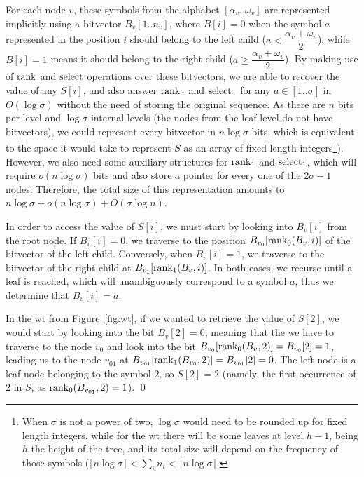 \documentclass[a4paper,10pt,twoside]{book}
\begin{document}
    For each node $v$, these symbols from the alphabet $[\alpha_v..\omega_v]$ are represented implicitly using a bitvector $B_v[1..n_v]$, where $B[i] = 0$ when the symbol $a$ represented in the position $i$ should belong to the left child ($a < \dfrac{\alpha_v + \omega_v}{2}$), while $B[i] = 1$ means it should belong to the right child ($a \geq \dfrac{\alpha_v + \omega_v}{2}$). By making use of $\operatorname{rank}$ and $\operatorname{select}$ operations over these bitvectors, we are able to recover the value of any $S[i]$, and also answer $\operatorname{rank}_a$ and $\operatorname{select}_a$ for any $a \in [1..\sigma]$ in $O(\log\sigma)$ without the need of storing the original sequence. As there are $n$ bits per level and $\log\sigma$ internal levels (the nodes from the leaf level do not have bitvectors), we could represent every bitvector in $n\log\sigma$ bits, which is equivalent to the space it would take to represent $S$ as an array of fixed length integers\footnote{When $\sigma$ is not a power of two, $\log\sigma$ would need to be rounded up for fixed length integers, while for the \gls{wt} there will be some leaves at level $h-1$, being $h$ the height of the tree, and its total size will depend on the frequency of those symbols ($\lfloor n\log\sigma\rfloor < \sum_i n_i < \rceil n\log\sigma\rceil$.}). However, we also need some auxiliary structures for $\operatorname{rank}_1$ and $\operatorname{select}_1$, which will require $o(n\log\sigma)$ bits and also store a pointer for every one of the $2\sigma-1$ nodes. Therefore, the total size of this representation amounts to $n\log\sigma + o(n\log\sigma) + O(\sigma\log n)$.
    
    In order to access the value of $S[i]$, we must start by looking into $B_v[i]$ from the root node. If $B_v[i]=0$, we traverse to the position $B_{v_0}[\operatorname{rank}_0(B_v,i)]$ of the bitvector of the left child. Conversely, when $B_v[i]=1$, we traverse to the bitvector of the right child at $B_{v_1}[\operatorname{rank}_1(B_v,i)]$. In both cases, we recurse until a leaf is reached, which will unambiguously correspond to a symbol $a$, thus we determine that $B_v[i]=a$.
    
    \begin{example} \label{exp:wtaccess}
    In the \gls{wt} from Figure~\ref{fig:wt}, if we wanted to retrieve the value of $S[2]$, we would start by looking into the bit $B_v[2]=0$, meaning that the we have to traverse to the node $v_0$ and look into the bit $B_{v_0}[\operatorname{rank}_0(B_v,2)] = B_{v_0}[2] = 1$, leading us to the node $v_{01}$ at $B_{v_{01}}[\operatorname{rank}_1(B_{v_0},2)] = B_{v_{01}}[2] = 0$. The left node is a leaf node belonging to the symbol $2$, so $S[2]=2$ (namely, the first occurrence of $2$ in $S$, as $\operatorname{rank}_0(B_{v_{01}}, 2) = 1$).
    \qed
    \end{example}
    
\end{document}
